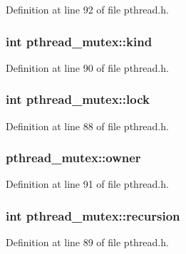 Definition at line 92 of file pthread.\+h.

\hypertarget{structpthread__mutex_a0a817c827021f648ceba78fb34b61f62}{
\subsubsection[{kind}]{\setlength{\rightskip}{0pt plus 5cm}int pthread\+\_\+mutex\+::kind}}\label{structpthread__mutex_a0a817c827021f648ceba78fb34b61f62}


Definition at line 90 of file pthread.\+h.

\hypertarget{structpthread__mutex_a039843af2bfee5ac32a1c4452108b833}{
\subsubsection[{lock}]{\setlength{\rightskip}{0pt plus 5cm}int pthread\+\_\+mutex\+::lock}}\label{structpthread__mutex_a039843af2bfee5ac32a1c4452108b833}


Definition at line 88 of file pthread.\+h.

\hypertarget{structpthread__mutex_a3d3ee80fcc9a148717677554d05d9d4a}{
\subsubsection[{owner}]{ pthread\+\_\+mutex\+::owner}}\label{structpthread__mutex_a3d3ee80fcc9a148717677554d05d9d4a}


Definition at line 91 of file pthread.\+h.

\hypertarget{structpthread__mutex_ad0a6948ac1d12f9ec3f11fea2ac07ff9}{
\subsubsection[{recursion}]{\setlength{\rightskip}{0pt plus 5cm}int pthread\+\_\+mutex\+::recursion}}\label{structpthread__mutex_ad0a6948ac1d12f9ec3f11fea2ac07ff9}


Definition at line 89 of file pthread.\+h.

